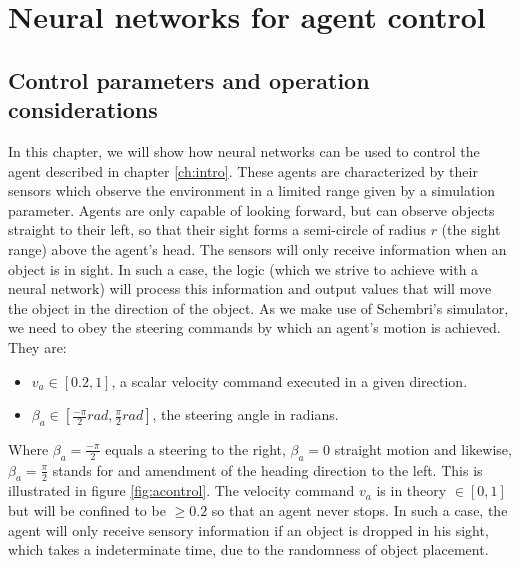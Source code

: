 \documentclass[10pt,a4paper,DIV=11]{scrreprt}
\begin{document}
\chapter{Neural networks for agent control}
\label{ch:design}

\section{Control parameters and operation considerations}
In this chapter, we will show how neural networks can be used to control the agent described in chapter \ref{ch:intro}. These agents are 
characterized by their sensors which observe the environment in a limited range given by a simulation parameter. Agents are only capable 
of looking forward, but can observe
objects straight to their left, so that their sight forms a semi-circle of radius $r$ (the sight range) above the agent's head. The sensors will only 
receive information when an object is in sight. In such a case, the logic (which we strive to achieve with a neural network) will process
this information and output values that will move the object in the direction of the object. As we make use
of Schembri's simulator, we need to obey the steering commands by which an agent's motion is achieved. They are:

\begin{itemize}
    \item $v_a \in [0.2,1]$, a scalar velocity command executed in a given direction.
    \item $\beta_a \in [\frac{-\pi}{2} rad, \frac{\pi}{2} rad]$, the steering angle in radians.
\end{itemize}

Where $\beta_a = \frac{-\pi}{2}$ equals a steering to the right, $\beta_a = 0$ straight motion and likewise, $\beta_a = \frac{\pi}{2}$ stands for and amendment
of the heading direction to the left.
This is illustrated in figure \ref{fig:acontrol}. The velocity command $v_a$ is in theory $ \in [0,1]$ but will be confined to be $\geq 0.2$ so that
an agent never stops. In such a case, the agent will only receive sensory information if an object is dropped in his sight, which takes a indeterminate
time, due to the randomness of object placement.
\end{document}
